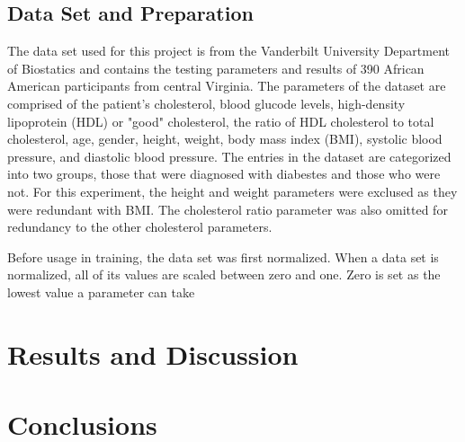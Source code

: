 \documentclass[12pt]{article}
\begin{document}
    \subsection{Data Set and Preparation}
        The data set used for this project is from the Vanderbilt University Department of Biostatics and contains
        the testing parameters and results of 390 African American participants from central Virginia.
        The parameters of the dataset are comprised of the patient's cholesterol, blood glucode levels, high-density lipoprotein (HDL)
        or "good" cholesterol, the ratio of HDL cholesterol to total cholesterol, age, gender, height, weight, body mass index (BMI),
        systolic blood pressure, and diastolic blood pressure.  The entries in the dataset are categorized into two groups, those that
        were diagnosed with diabestes and those who were not.  For this experiment, the height and weight parameters were exclused
        as they were redundant with BMI.  The cholesterol ratio parameter was also omitted for redundancy to the other cholesterol parameters.

        Before usage in training, the data set was first normalized.  When a data set is normalized, all of its values are scaled
        between zero and one.  Zero is set as the lowest value a parameter can take

\section{Results and Discussion}

\section{Conclusions}

\begin{thebibliography}{100}
\end{thebibliography}
\end{document}
